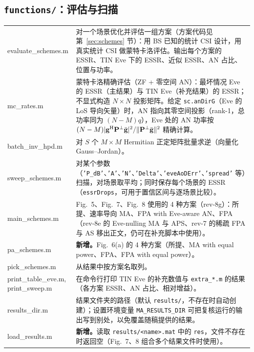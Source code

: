 \documentclass[11pt,a4paper]{ctexart}
\newcommand{\code}[1]{\texttt{#1}}
\begin{document}
\subsection{\code{functions/}：评估与扫描}
\begin{longtable}{>{\ttfamily\small}p{4.6cm}p{11.2cm}}
\toprule
evaluate\_schemes.m & 对一个场景优化并评估一组方案（方案代码见第~\ref{sec:schemes} 节）：用 BS 已知的统计 CSI 设计，用真实统计 CSI 做蒙特卡洛评估。输出每个方案的 ESSR、TIN Eve 下的 ESSR、近似 ESSR、AN 占比、位置与功率。\\
mc\_rates.m & 蒙特卡洛精确评估（ZF + 零空间 AN）：最坏情况 Eve 的 ESSR（主结果）与 TIN Eve（补充结果）的 ESSR；不显式构造 $N\times N$ 投影矩阵。给定 \code{sc.anDirG}（Eve 的 LoS 导向矢量）时，AN 指向其零空间投影（rank-1，总功率同为 $(N-M)q$），Eve 处的 AN 功率按 $(N-M)|\mathbf g^{\rm H}\mathbf P^\perp\bar{\mathbf g}|^2/\|\mathbf P^\perp\bar{\mathbf g}\|^2$ 精确计算。\\
batch\_inv\_hpd.m & 对 $S$ 个 $M\times M$ Hermitian 正定矩阵批量求逆（向量化 Gauss--Jordan）。\\
sweep\_schemes.m & 对某个参数（\code{'P\_dB'}、\code{'A'}、\code{'N'}、\code{'Delta'}、\code{'eveAoDErr'}、\code{'spread'} 等）扫描，对场景取平均；同时保存每个场景的 ESSR（\code{essrDrops}，可用于置信区间与逐场景比较）。\\
main\_schemes.m & Fig.~5、Fig.~7、Fig.~8 使用的 4 种方案（rev-8g）：所提、速率导向 MA、FPA with Eve-aware AN、FPA（rev-8e 的 Eve-nulling MA 与 APS、rev-7 的稀疏 FPA 与 AS 移出正文，仍可在补充脚本中使用）。\\
pa\_schemes.m & \textbf{新增。}Fig.~6(a) 的 4 种方案（所提、MA with equal power、FPA、FPA with equal power）。\\
pick\_schemes.m & 从结果中按方案名取列。\\
print\_table\_eve.m, print\_sweep.m & 在命令行打印 TIN Eve 的补充数值与 \code{extra\_*.m} 的结果（各方案 ESSR、AN 占比、相对增益）。\\
results\_dir.m & 结果文件夹的路径（默认 \code{results/}，不存在时自动创建）；设置环境变量 \code{MA\_RESULTS\_DIR} 可把复核运行的输出写到别处，以免覆盖随稿提供的结果。\\
load\_results.m & \textbf{新增。}读取 \code{results/<name>.mat} 中的 \code{res}，文件不存在时返回空（Fig.~7、8 组合多个结果文件时使用）。\\
\bottomrule
\end{longtable}
\end{document}
